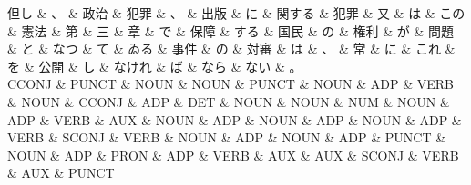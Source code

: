 \documentclass[tikz,border=5pt]{standalone}
\begin{document}
\small
\begin{dependency}[edge unit distance=6.8pt]
    \begin{deptext}[column sep=0.5em]
        但し \& 、 \& 政治 \& 犯罪 \& 、 \& 出版 \& に \& 関する \& 犯罪 \& 又 \& は \& この \& 憲法 \& 第 \& 三 \& 章 \& で \& 保障 \& する \& 国民 \& の \& 権利 \& が \& 問題 \& と \& なつ \& て \& ゐる \& 事件 \& の \& 対審 \& は \& 、 \& 常 \& に \& これ \& を \& 公開 \& し \& なけれ \& ば \& なら \& ない \& 。\\
        CCONJ \& PUNCT \& NOUN \& NOUN \& PUNCT \& NOUN \& ADP \& VERB \& NOUN \& CCONJ \& ADP \& DET \& NOUN \& NOUN \& NUM \& NOUN \& ADP \& VERB \& AUX \& NOUN \& ADP \& NOUN \& ADP \& NOUN \& ADP \& VERB \& SCONJ \& VERB \& NOUN \& ADP \& NOUN \& ADP \& PUNCT \& NOUN \& ADP \& PRON \& ADP \& VERB \& AUX \& AUX \& SCONJ \& VERB \& AUX \& PUNCT\\
    \end{deptext}
\end{dependency}
\end{document}
